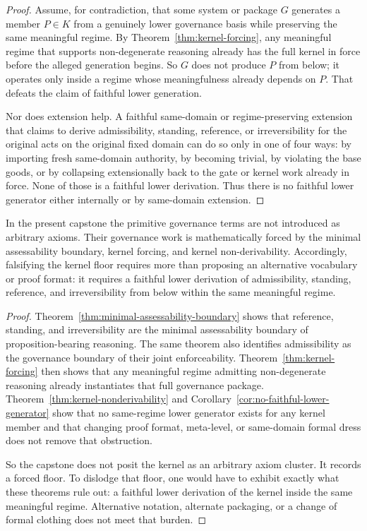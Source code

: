 \begin{proof}
Assume, for contradiction, that some system or package $G$ generates a member $P \in K$ from a genuinely lower governance basis while preserving the same meaningful regime. By Theorem~\ref{thm:kernel-forcing}, any meaningful regime that supports non-degenerate reasoning already has the full kernel in force before the alleged generation begins. So $G$ does not produce $P$ from below; it operates only inside a regime whose meaningfulness already depends on $P$. That defeats the claim of faithful lower generation.

Nor does extension help. A faithful same-domain or regime-preserving extension that claims to derive admissibility, standing, reference, or irreversibility for the original acts on the original fixed domain can do so only in one of four ways: by importing fresh same-domain authority, by becoming trivial, by violating the base goods, or by collapsing extensionally back to the gate or kernel work already in force. None of those is a faithful lower derivation. Thus there is no faithful lower generator either internally or by same-domain extension.\cite{MaleyFoundationalClosure,MaleyNecessity}
\end{proof}

\begin{theorem}
\label{thm:kernel-floor-derived}
In the present capstone the primitive governance terms are not introduced as arbitrary axioms. Their governance work is mathematically forced by the minimal assessability boundary, kernel forcing, and kernel non-derivability. Accordingly, falsifying the kernel floor requires more than proposing an alternative vocabulary or proof format: it requires a faithful lower derivation of admissibility, standing, reference, and irreversibility from below within the same meaningful regime.
\end{theorem}

\begin{proof}
Theorem~\ref{thm:minimal-assessability-boundary} shows that reference, standing, and irreversibility are the minimal assessability boundary of proposition-bearing reasoning. The same theorem also identifies admissibility as the governance boundary of their joint enforceability. Theorem~\ref{thm:kernel-forcing} then shows that any meaningful regime admitting non-degenerate reasoning already instantiates that full governance package. Theorem~\ref{thm:kernel-nonderivability} and Corollary~\ref{cor:no-faithful-lower-generator} show that no same-regime lower generator exists for any kernel member and that changing proof format, meta-level, or same-domain formal dress does not remove that obstruction.

So the capstone does not posit the kernel as an arbitrary axiom cluster. It records a forced floor. To dislodge that floor, one would have to exhibit exactly what these theorems rule out: a faithful lower derivation of the kernel inside the same meaningful regime. Alternative notation, alternate packaging, or a change of formal clothing does not meet that burden.
\end{proof}

